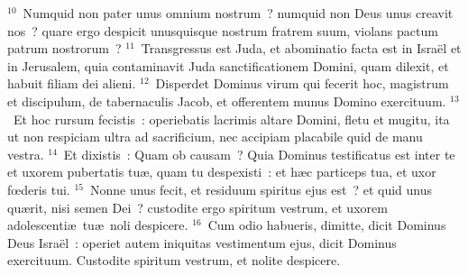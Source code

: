 ${}^{10}$~Numquid non pater unus omnium nostrum~? numquid non Deus unus creavit nos~? quare ergo despicit unusquisque nostrum fratrem suum, violans pactum patrum nostrorum~?
${}^{11}$~Transgressus est Juda, et abominatio facta est in Isra\"el et in Jerusalem, quia contaminavit Juda sanctificationem Domini, quam dilexit, et habuit filiam dei alieni.
${}^{12}$~Disperdet Dominus virum qui fecerit hoc, magistrum et discipulum, de tabernaculis Jacob, et offerentem munus Domino exercituum.
${}^{13}$~Et hoc rursum fecistis~: operiebatis lacrimis altare Domini, fletu et mugitu, ita ut non respiciam ultra ad sacrificium, nec accipiam placabile quid de manu vestra.
${}^{14}$~Et dixistis~: Quam ob causam~? Quia Dominus testificatus est inter te et uxorem pubertatis tu\ae , quam tu despexisti~: et h\ae c particeps tua, et uxor fœderis tui.
${}^{15}$~Nonne unus fecit, et residuum spiritus ejus est~? et quid unus qu\ae rit, nisi semen Dei~? custodite ergo spiritum vestrum, et uxorem adolescenti\ae\ tu\ae\ noli despicere.
${}^{16}$~Cum odio habueris, dimitte, dicit Dominus Deus Isra\"el~: operiet autem iniquitas vestimentum ejus, dicit Dominus exercituum. Custodite spiritum vestrum, et nolite despicere.


